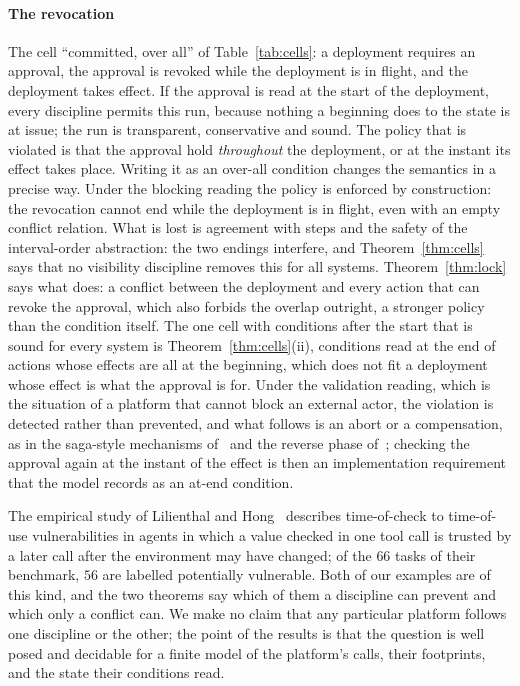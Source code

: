 \documentclass[preprint,12pt]{elsarticle}
\theoremstyle{plain}
\theoremstyle{definition}
\begin{document}
\paragraph{The revocation}
The cell ``committed, over all'' of Table~\ref{tab:cells}: a deployment requires an approval, the approval is revoked while the deployment is in flight, and the deployment takes effect. If the approval is read at the start of the deployment, every discipline permits this run, because nothing a beginning does to the state is at issue; the run is transparent, conservative and sound. The policy that is violated is that the approval hold \emph{throughout} the deployment, or at the instant its effect takes place. Writing it as an over-all condition changes the semantics in a precise way. Under the blocking reading the policy is enforced by construction: the revocation cannot end while the deployment is in flight, even with an empty conflict relation. What is lost is agreement with steps and the safety of the interval-order abstraction: the two endings interfere, and Theorem~\ref{thm:cells} says that no visibility discipline removes this for all systems. Theorem~\ref{thm:lock} says what does: a conflict between the deployment and every action that can revoke the approval, which also forbids the overlap outright, a stronger policy than the condition itself. The one cell with conditions after the start that is sound for every system is Theorem~\ref{thm:cells}(ii), conditions read at the end of actions whose effects are all at the beginning, which does not fit a deployment whose effect is what the approval is for. Under the validation reading, which is the situation of a platform that cannot block an external actor, the violation is detected rather than prevented, and what follows is an abort or a compensation, as in the saga-style mechanisms of~\cite{ChangGeng2025SagaLLM} and the reverse phase of~\cite{LyuEtAl2026CoAgent}; checking the approval again at the instant of the effect is then an implementation requirement that the model records as an at-end condition.

The empirical study of Lilienthal and Hong~\cite{LilienthalHong2025} describes time-of-check to time-of-use vulnerabilities in agents in which a value checked in one tool call is trusted by a later call after the environment may have changed; of the $66$ tasks of their benchmark, $56$ are labelled potentially vulnerable. Both of our examples are of this kind, and the two theorems say which of them a discipline can prevent and which only a conflict can. We make no claim that any particular platform follows one discipline or the other; the point of the results is that the question is well posed and decidable for a finite model of the platform's calls, their footprints, and the state their conditions read.
\end{document}
